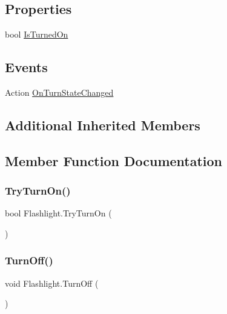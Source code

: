 \subsection*{Properties}
\begin{DoxyCompactItemize}
\item 
bool \mbox{\hyperlink{class_flashlight_af4f54c39720c0d71687ee5b751dcffe6}{Is\+Turned\+On}}
\end{DoxyCompactItemize}
\subsection*{Events}
\begin{DoxyCompactItemize}
\item 
Action \mbox{\hyperlink{class_flashlight_a40dbd30e5c1fbe46888d860d9d835a08}{On\+Turn\+State\+Changed}}
\end{DoxyCompactItemize}
\subsection*{Additional Inherited Members}


\subsection{Member Function Documentation}
\mbox{\label{class_flashlight_a9cf56fe93b952c00c6fd3e7ea335eb26}} 
\subsubsection{\texorpdfstring{Try\+Turn\+On()}{TryTurnOn()}}
{\footnotesize\ttfamily bool Flashlight.\+Try\+Turn\+On (\begin{DoxyParamCaption}{ }\end{DoxyParamCaption})}

\mbox{\label{class_flashlight_adcf66c329c6f6fdc47ef2418fc55fb73}} 
\subsubsection{\texorpdfstring{Turn\+Off()}{TurnOff()}}
{\footnotesize\ttfamily void Flashlight.\+Turn\+Off (\begin{DoxyParamCaption}{ }\end{DoxyParamCaption})}



